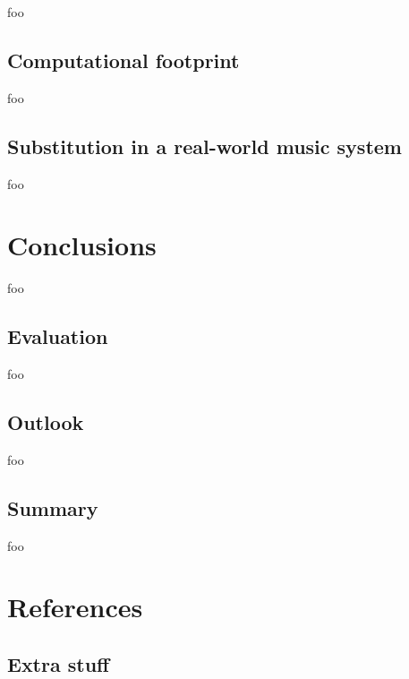 \documentclass[letter,12pt,notitlepage]{article}
\begin{document}
foo

\subsection{Computational footprint}

foo

\subsection{Substitution in a real-world music system}

foo

\vfill
\clearpage

\section{Conclusions}
\label{sec:conclusion}

foo

\subsection{Evaluation}

foo

\subsection{Outlook}

foo

\subsection{Summary}

foo

\vfill
\clearpage %

\section{References}
\printbibliography[heading=none]

\vfill
\clearpage %

\begin{appendices}

\section{Extra stuff}
\label{appendix:rthpss}

\end{appendices}
\end{document}
